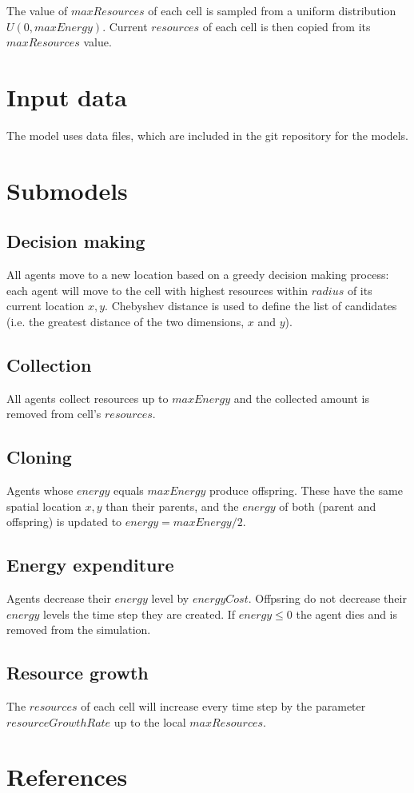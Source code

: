 \documentclass[11pt,a4paper,twocolumn,notitlepage]{article}
\begin{document}
The value of $maxResources$ of each cell is sampled from a uniform distribution $U(0,maxEnergy)$. Current $resources$ of each cell is then copied from its $maxResources$ value.

\section{Input data}

The model uses data files, which are included in the git repository for the models.

\section{Submodels}

\subsection{Decision making}

All agents move to a new location based on a greedy decision making process: each agent will move to the cell with highest resources within $radius$ of its current location $x,y$. Chebyshev distance is used to define the list of candidates (i.e. the greatest distance of the two dimensions, $x$ and $y$). %

\subsection{Collection}

All agents collect resources up to $maxEnergy$ and the collected amount is removed from cell's $resources$. 

\subsection{Cloning}

Agents whose $energy$ equals $maxEnergy$ produce offspring. These have the same spatial location $x,y$ than their parents, and the $energy$ of both (parent and offspring) is updated to $energy = maxEnergy/2$.

\subsection{Energy expenditure}

Agents decrease their $energy$ level by $energyCost$. Offpsring do not decrease their $energy$ levels the time step they are created. If $energy \leq 0$ the agent dies and is removed from the simulation.

\subsection{Resource growth}

The $resources$ of each cell will increase every time step by the parameter $resourceGrowthRate$ up to the local $maxResources$.

\section{References}


\end{document}
